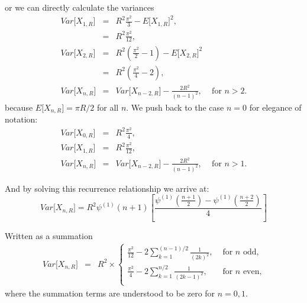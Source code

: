 or we can directly calculate the variances
\begin{eqnarray}
  \label{eq:mean_nsphere_geo}
  Var\big[ X_{1,R} \big] & = & R^2 \frac{\pi^2}{3} - E\big[ X_{1,R} \big]^2, \nonumber\\ 
              & = & R^2 \frac{\pi^2}{12}, \nonumber\\ 
  Var\big[ X_{2,R} \big] & = &  R^2 \left( \frac{\pi^2}{2} - 1 \right) - E\big[ X_{2,R} \big]^2 \nonumber\\ 
               & = & R^2\left(  \frac{\pi^2}{4} - 2 \right), \nonumber\\ 
  Var\big[ X_{n,R} \big] & = & Var\big[ X_{n-2,R} \big] 
                                   - \frac{2 R^2}{(n-1)^2}, \;\;\;
                                   \mbox{ for } n > 2.\nonumber
\end{eqnarray}
because $E\big[ X_{n,R} \big] = \pi R /2$ for all $n$.  We push back
to the case $n=0$ for elegance of notation: 
\begin{eqnarray}
  \label{eq:mean_nsphere_geo}
  Var\big[ X_{0,R} \big] & = & R^2 \frac{\pi^2}{4}, \\ 
  Var\big[ X_{1,R} \big] & = & R^2 \frac{\pi^2}{12}, \\ 
  Var\big[ X_{n,R} \big] & = & Var\big[ X_{n-2,R} \big] 
                                   - \frac{2 R^2}{(n-1)^2}, \;\;\;
                                   \mbox{ for } n > 1.
\end{eqnarray}

And by solving this recurrence relationship we arrive at:
\begin{equation}
Var\big[ X_{n,R} \big] =   R^2\psi ^{(1)}(n+1)  \left[\frac{\psi ^{(1)}\left(\frac{n+1}{2}\right) -\psi
   ^{(1)}\left(\frac{n+2}{2}\right)}{4}\right]
\end{equation}   

   
   
Written as a summation
\begin{eqnarray}
  \label{eq:mean_nsphere_geo}
  Var\big[ X_{n,R} \big] & = & R^2 \times \left\{ \begin{array}{ll}
      \displaystyle
         \frac{\pi^2}{12} 
        - 2 \sum_{k=1}^{(n-1)/2} \frac{1}{(2k)^2}, & 
          \mbox{ for $n$ odd,} \\ 
      \displaystyle
          \frac{\pi^2}{4} 
        - 2 \sum_{k=1}^{n/2} \frac{1}{(2k-1)^2}, &
          \mbox{ for $n$ even,} \\ 
    \end{array} \right.
\end{eqnarray}
where the summation terms are understood to be zero for $n=0, 1$.

